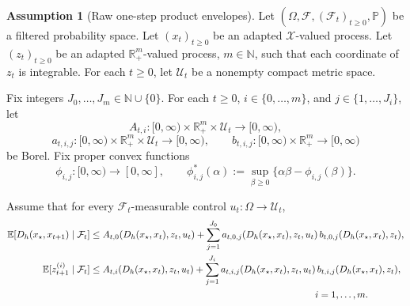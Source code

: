 \documentclass{article}
\theoremstyle{definition}
\newtheorem{assumption}[theorem]{Assumption}
\begin{document}
\begin{assumption}[Raw one-step product envelopes]
\label{ass:raw}
Let $(\Omega,\mathcal F,(\mathcal F_t)_{t\ge 0},\mathbb P)$ be a filtered probability space.
Let $(x_t)_{t\ge 0}$ be an adapted $\mathcal X$-valued process.
Let $(z_t)_{t\ge 0}$ be an adapted $\mathbb R_+^m$-valued process, $m\in\mathbb N$, such that each coordinate of $z_t$ is integrable.
For each $t\ge 0$, let $\mathcal U_t$ be a nonempty compact metric space.

Fix integers $J_0,\dots,J_m\in\mathbb N\cup\{0\}$.
For each $t\ge 0$, $i\in\{0,\dots,m\}$, and $j\in\{1,\dots,J_i\}$, let
\[
A_{t,i}:[0,\infty)\times\mathbb R_+^m\times\mathcal U_t\to[0,\infty),
\]
\[
a_{t,i,j}:[0,\infty)\times\mathbb R_+^m\times\mathcal U_t\to[0,\infty),
\qquad
b_{t,i,j}:[0,\infty)\times\mathbb R_+^m\to[0,\infty)
\]
be Borel.
Fix proper convex functions
\[
\phi_{i,j}:[0,\infty)\to[0,\infty],
\qquad
\phi_{i,j}^\ast(\alpha):=\sup_{\beta\ge 0}\{\alpha\beta-\phi_{i,j}(\beta)\}.
\]

Assume that for every $\mathcal F_t$-measurable control $u_t:\Omega\to\mathcal U_t$,
\begin{align}
\mathbb E[D_h(x_\star,x_{t+1})\mid\mathcal F_t]
&\le
A_{t,0}(D_h(x_\star,x_t),z_t,u_t)
+
\sum_{j=1}^{J_0}
a_{t,0,j}(D_h(x_\star,x_t),z_t,u_t)\,
b_{t,0,j}(D_h(x_\star,x_t),z_t),
\label{eq:raw0}
\\
\mathbb E[z_{t+1}^{(i)}\mid\mathcal F_t]
&\le
A_{t,i}(D_h(x_\star,x_t),z_t,u_t)
+
\sum_{j=1}^{J_i}
a_{t,i,j}(D_h(x_\star,x_t),z_t,u_t)\,
b_{t,i,j}(D_h(x_\star,x_t),z_t),
\notag\\
&\hspace{8.3cm}
i=1,\dots,m.
\label{eq:rawi}
\end{align}
\end{assumption}
\end{document}
